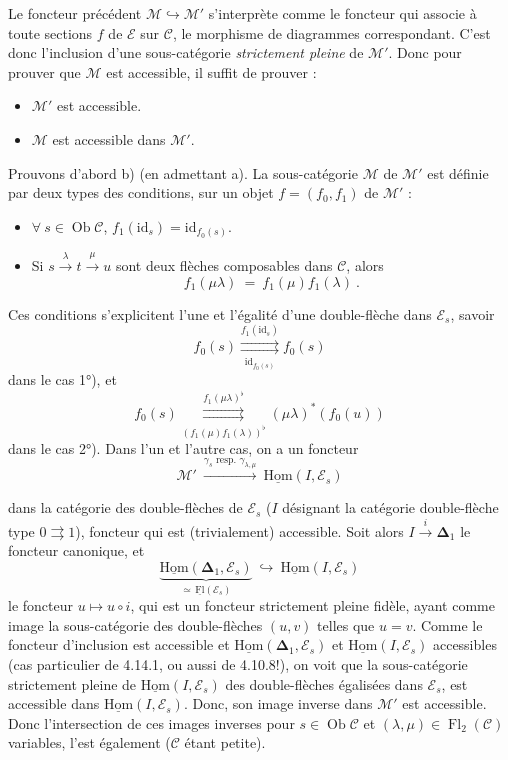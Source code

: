 \documentclass[11pt]{article}
\newcommand{\printedpage}[1]{\marginpar{\footnotesize p.~#1}}
\newcommand{\msp}[1]{\marginpar{\footnotesize [#1]}}
\newcommand{\Ob}{\operatorname{Ob}}
\newcommand{\Fl}{\operatorname{Fl}}
\newcommand{\id}{\mathrm{id}}
\newcommand{\uHom}{\underline{\mathrm{Hom}}}
\newcommand{\uFl}{\underline{\mathrm{Fl}}}
\newcommand{\bDelta}{\boldsymbol{\Delta}}
\begin{document}
\msp{page 404}
Le foncteur précédent $\mathcal{M} \hookrightarrow \mathcal{M}'$ s’interprète comme le foncteur qui associe à toute sections $f$ de $\mathcal{E}$ sur $\mathcal{C}$, le morphisme de diagrammes correspondant. C’est donc l’inclusion d’une sous-catégorie \textit{strictement pleine} de $\mathcal{M}'$. Donc pour prouver que $\mathcal{M}$ est accessible, il suffit de prouver : %
\begin{itemize}[leftmargin=2.5em]
\item[a)] $\mathcal{M}'$ est accessible.
\item[b)] $\mathcal{M}$ est accessible dans $\mathcal{M}'$.
\end{itemize}
Prouvons d’abord b) (en admettant a). La sous-catégorie $\mathcal{M}$ de $\mathcal{M}'$ est définie par deux types des conditions, sur un objet $f = (f_0,f_1)$ de $\mathcal{M}'$ :
\begin{itemize}[leftmargin=2.5em]
\item[1°)] $\forall\ s \in \Ob\mathcal{C}$, $f_1(\id_s) = \id_{f_0(s)}$.
\item[2°)] Si $s \xrightarrow{\lambda} t \xrightarrow{\mu} u$ sont deux flèches composables dans $\mathcal{C}$, alors
\[
f_1(\mu\lambda) \ = \ f_1(\mu)f_1(\lambda) \ .
\]
\end{itemize}
Ces conditions s’explicitent l’une et l’égalité d’une double-flèche dans $\mathcal{E}_s$,
\msp{page 405}
savoir
\[
f_0(s) \overset{f_1(\id_s)}{\underset{\id_{f_0(s)}}{\rightrightarrows}} f_0(s)
\]
dans le cas 1°), et
\[
f_0(s) \overset{f_1(\mu\lambda)^\flat}{\underset{(f_1(\mu)f_1(\lambda))^\flat}{\rightrightarrows}} (\mu\lambda)^*(f_0(u))
\]
dans le cas 2°). Dans l’un et l’autre cas, on a un foncteur
\[
\mathcal{M}' \ \xrightarrow{\gamma_s \text{ resp. } \gamma_{\lambda,\mu}} \ \uHom(I,\mathcal{E}_s)
\]

\printedpage{154}
dans la catégorie des double-flèches de $\mathcal{E}_s$ ($I$ désignant la catégorie double-flèche type $0\rightrightarrows 1$), foncteur qui est (trivialement) accessible. Soit alors $I\xrightarrow{\;i\;}\bDelta_1$ le foncteur canonique, et
\[
\underbrace{\uHom(\bDelta_1,\mathcal{E}_s)}_{\simeq\,\uFl(\mathcal{E}_s)}\ \hookrightarrow\ \uHom(I,\mathcal{E}_s)
\]
le foncteur $u\longmapsto u\circ i$, qui est un foncteur strictement pleine fidèle, ayant comme image la sous-catégorie des double-flèches $(u,v)$ telles que $u=v$. Comme le foncteur d'inclusion est accessible et $\uHom(\bDelta_1,\mathcal{E}_s)$ et $\uHom(I,\mathcal{E}_s)$ accessibles
\msp{page 406}
(cas particulier de 4.14.1, ou aussi de 4.10.8!), on voit que la sous-catégorie strictement pleine de $\uHom(I,\mathcal{E}_s)$ des double-flèches égalisées dans $\mathcal{E}_s$, est accessible dans $\uHom(I,\mathcal{E}_s)$. Donc, son image inverse dans $\mathcal{M}'$ est accessible. Donc l'intersection de ces images inverses pour $s\in\Ob\mathcal{C}$ et $(\lambda,\mu)\in\Fl_2(\mathcal{C})$ variables, l'est également ($\mathcal{C}$ étant petite).
\end{document}
